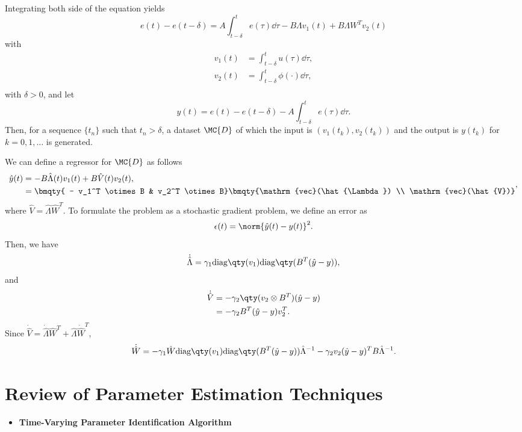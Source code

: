 \documentclass{my-handout}
\begin{document}
Integrating both side of the equation yields \[
e(t) - e(t-\delta) = A \int_{t-\delta}^t e(\tau) \dd{\tau} - B \Lambda v_1(t) +
B \Lambda W^T v_2(t)
\] with \[
\begin{aligned}
    v_1(t) &= \int_{t-\delta}^t u(\tau) \dd{\tau}, \\
    v_2(t) &= \int_{t-\delta}^t \phi(\cdot) \dd{\tau}, \\
\end{aligned}
\] with \(\delta > 0\), and let \[
y(t) = e(t) - e(t - \delta) - A \int_{t - \delta}^{t} e(\tau) \dd{\tau}.
\] Then, for a sequence \(\{t_n\}\) such that \(t_n > \delta\), a
dataset \(\MC{D}\) of which the input is \((v_1(t_k), v_2(t_k))\) and
the output is \(y(t_k)\) for \(k=0,1,\dotsc\) is generated.

We can define a regressor for \(\MC{D}\) as follows
\begin{equation}
	\begin{aligned}
		\hat{y}(t) &= - B \hat{\Lambda}(t) v_1(t) + B \hat{V}(t) v_2(t),\\
		&= \bmqty{ - v_1^T \otimes B & v_2^T \otimes B}
		\bmqty{\mathrm{vec}(\hat{\Lambda}) \\ \mathrm{vec}(\hat{V})}
	\end{aligned},
\end{equation}
where \(\hat{V} = \hat{\Lambda} \hat{W}^T\). To formulate the problem
as a stochastic gradient problem, we define an error as \[
\epsilon(t) = \norm{\hat{y}(t) - y(t)}^2.
\] Then, we have \[
\dot{\hat{\Lambda}} = \gamma_1 \mathrm{diag}\qty(v_1) \mathrm{diag}\qty(B^T
(\hat{y} - y)),
\] and \[
\begin{aligned}
    \dot{\hat{V}} &=  - \gamma_2 \qty(v_2 \otimes B^T) (\hat{y} - y) \\
    &= - \gamma_2 B^T (\hat{y} - y) v_2^T.
\end{aligned}
\] Since
\(\dot{\hat{V}} = \dot{\hat{\Lambda}} \hat{W}^T + \hat{\Lambda} \dot{\hat{W}}^T\),
\[
\dot{\hat{W}} = - \gamma_1 \hat{W} \mathrm{diag}\qty(v_1) \mathrm{diag}\qty(B^T
(\hat{y} - y)) \hat{\Lambda}^{-1} - \gamma_2 v_2 (\hat{y} - y)^T B
\hat{\Lambda}^{-1}.
\]

\section{Review of Parameter Estimation Techniques}

\begin{itemize}
\tightlist
\item
	\textbf{Time-Varying Parameter Identification
	Algorithm}\cite{rios_time-varying_2017}
\end{itemize}
\end{document}
